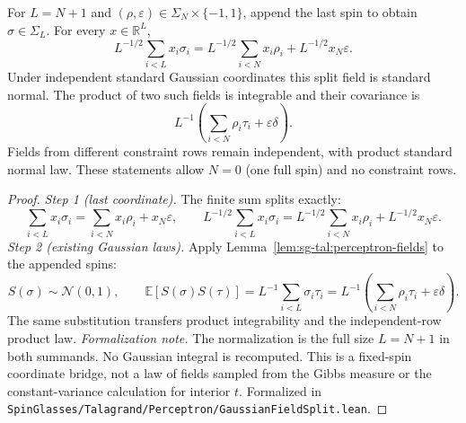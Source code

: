 \begin{lemma}\label{lem:sg-tal:perceptron-field-split}
  \leanok
For $L=N+1$ and $(\rho,\varepsilon)\in\Sigma_N\times\{-1,1\}$, append the last spin to obtain
$\sigma\in\Sigma_L$. For every $x\in\mathbb R^L$,
\[
 L^{-1/2}\sum_{i<L}x_i\sigma_i
 =L^{-1/2}\sum_{i<N}x_i\rho_i+L^{-1/2}x_N\varepsilon.
\]
Under independent standard Gaussian coordinates this split field is standard normal.
The product of two such fields is integrable and their covariance is
\[
 L^{-1}\left(\sum_{i<N}\rho_i\tau_i+\varepsilon\delta\right).
\]
Fields from different constraint rows remain independent, with product standard normal law.
These statements allow $N=0$ (one full spin) and no constraint rows.
\end{lemma}
\begin{proof}
  \leanok
\emph{Step 1 (last coordinate).} The finite sum splits exactly:
\[
 \sum_{i<L}x_i\sigma_i=\sum_{i<N}x_i\rho_i+x_N\varepsilon,\qquad
 L^{-1/2}\sum_{i<L}x_i\sigma_i
 =L^{-1/2}\sum_{i<N}x_i\rho_i+L^{-1/2}x_N\varepsilon.
\]
\emph{Step 2 (existing Gaussian laws).} Apply Lemma~\ref{lem:sg-tal:perceptron-fields} to the appended spins:
\[
 S(\sigma)\sim\mathcal N(0,1),\qquad
 \mathbb E[S(\sigma)S(\tau)]
 =L^{-1}\sum_{i<L}\sigma_i\tau_i
 =L^{-1}\left(\sum_{i<N}\rho_i\tau_i+\varepsilon\delta\right).
\]
The same substitution transfers product integrability and the independent-row product law.
\emph{Formalization note.} The normalization is the full size $L=N+1$ in both summands.
No Gaussian integral is recomputed. This is a fixed-spin coordinate bridge, not a law of fields
sampled from the Gibbs measure or the constant-variance calculation for interior $t$.
Formalized in \texttt{SpinGlasses/Talagrand/Perceptron/GaussianFieldSplit.lean}.
\end{proof}

